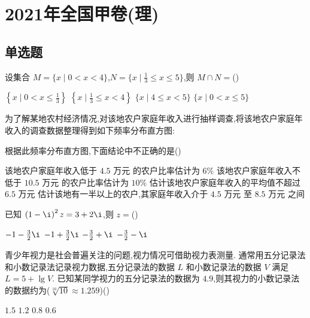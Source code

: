 
\chapter{2021年全国甲卷(理)}

\section{单选题}

\begin{problem}
设集合 \(M=\{x\mid 0<x<4\}\),\(N=\{x\mid \frac{1}{3}\le x\le 5\}\),则 \(M\cap N=\)(\quad)

\choices
    {\(\left\{x\mid 0<x\le \frac{1}{3}\right\}\)}
    {\(\left\{x\mid \frac{1}{3}\le x<4\right\}\)}
    {\(\{x\mid 4\le x<5\}\)}
    {\(\{x\mid 0<x\le 5\}\)}

\end{problem}

\begin{problem}
为了解某地农村经济情况,对该地农户家庭年收入进行抽样调查,将该地农户家庭年收入的调查数据整理得到如下频率分布直方图:


根据此频率分布直方图,下面结论中不正确的是(\quad)

\choices
    {该地农户家庭年收入低于 \(4.5\text{ 万元}\) 的农户比率估计为 \(6\%\)}
    {该地农户家庭年收入不低于 \(10.5\text{ 万元}\) 的农户比率估计为 \(10\%\)}
    {估计该地农户家庭年收入的平均值不超过 \(6.5\) 万元}
    {估计该地有一半以上的农户,其家庭年收入介于 \(4.5\text{ 万元}\) 至 \(8.5\text{ 万元}\) 之间}

\end{problem}

\begin{problem}
已知 \(\left(1-\i\right)^2z=3+2\i\),则 \(z=\)(\quad)

\choices
    {\(-1-\frac{3}{2}\i\)}
    {\(-1+\frac{3}{2}\i\)}
    {\(-\frac{3}{2}+\i\)}
    {\(-\frac{3}{2}-\i\)}

\end{problem}

\begin{problem}
青少年视力是社会普遍关注的问题,视力情况可借助视力表测量. 通常用五分记录法和小数记录法记录视力数据,五分记录法的数据 \(L\) 和小数记录法的数据 \(V\) 满足 \(L=5+\lg V\). 已知某同学视力的五分记录法的数据为 \(4.9\),则其视力的小数记录法的数据约为(\(\sqrt[10]{10}\approx 1.259\))(\quad)

\choices
    {\(1.5\)}
    {\(1.2\)}
    {\(0.8\)}
    {\(0.6\)}

\end{problem}

